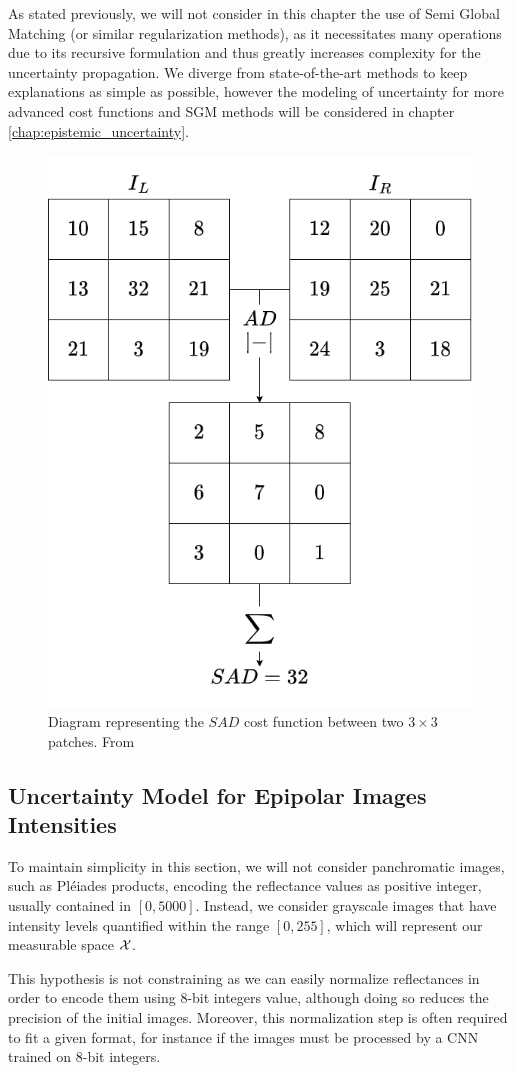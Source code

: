 As stated previously, we will not consider in this chapter the use of Semi Global Matching (or similar regularization methods), as it necessitates many operations due to its recursive formulation and thus greatly increases complexity for the uncertainty propagation. We diverge from state-of-the-art methods to keep explanations as simple as possible, however the modeling of uncertainty for more advanced cost functions and SGM methods will be considered in chapter \ref{chap:epistemic_uncertainty}.


\begin{figure}
    \centering
    \includegraphics[width=0.5\linewidth]{Images/Chap_4/SAD.png}
    \caption{Diagram representing the $SAD$ cost function between two $3\times3$ patches. From \cite{malinowski_uncertainty_2024}}
    \label{fig:SAD}
\end{figure}

\subsection{Uncertainty Model for Epipolar Images Intensities}
To maintain simplicity in this section, we will not consider panchromatic images, such as Pléiades products, encoding the reflectance values as positive integer, usually contained in $[0, 5000]$. Instead, we consider grayscale images that have intensity levels quantified within the range $[0, 255]$, which will represent our measurable space ${\mathcal{X}}$.

\begin{remark}
    This hypothesis is not constraining as we can easily normalize reflectances in order to encode them using 8-bit integers value, although doing so reduces the precision of the initial images. Moreover, this normalization step is often required to fit a given format, for instance if the images must be processed by a CNN trained on 8-bit integers.
\end{remark}

